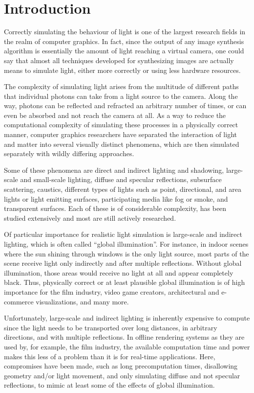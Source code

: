 
\chapter{Introduction}
\label{chap:introduction}

Correctly simulating the behaviour of light is one of the largest research fields in the realm of computer graphics. In fact, since the output of any image synthesis algorithm is essentially the amount of light reaching a virtual camera, one could say that almost all techniques developed for synthesizing images are actually means to simulate light, either more correctly or using less hardware resources.

The complexity of simulating light arises from the multitude of different paths that individual photons can take from a light source to the camera. Along the way, photons can be reflected and refracted an arbitrary number of times, or can even be absorbed and not reach the camera at all. As a way to reduce the computational complexity of simulating these processes in a physically correct manner, computer graphics researchers have separated the interaction of light and matter into several visually distinct phenomena, which are then simulated separately with wildly differing approaches.

Some of these phenomena are direct and indirect lighting and shadowing, large-scale and small-scale lighting, diffuse and specular reflections, subsurface scattering, caustics, different types of lights such as point, directional, and area lights or light emitting surfaces, participating media like fog or smoke, and transparent surfaces. Each of these is of considerable complexity, has been studied extensively and most are still actively researched.

Of particular importance for realistic light simulation is large-scale and indirect lighting, which is often called ``global illumination''. For instance, in indoor scenes where the sun shining through windows is the only light source, most parts of the scene receive light only indirectly and after multiple reflections. Without global illumination, those areas would receive no light at all and appear completely black. Thus, physically correct or at least plausible global illumination is of high importance for the film industry, video game creators, architectural and e-commerce visualizations, and many more.

Unfortunately, large-scale and indirect lighting is inherently expensive to compute since the light needs to be transported over long distances, in arbitrary directions, and with multiple reflections. In offline rendering systems as they are used by, for example, the film industry, the available computation time and power makes this less of a problem than it is for real-time applications. Here, compromises have been made, such as long precomputation times, disallowing geometry and/or light movement, and only simulating diffuse and not specular reflections, to mimic at least some of the effects of global illumination.

